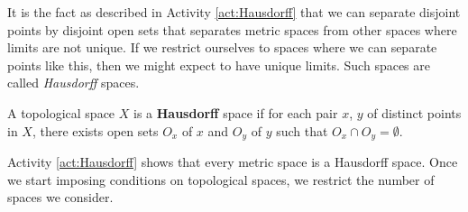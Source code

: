 \begin{comment}

\ActivitySolution

\ba
\item Consider a metric space $(x,d)$, and let $x$ and $y$ be distinct points in $X$. 
	\begin{enumerate}[i.]
	\item Suppose a sequence $(x_n)$ has $x$ as a limit. Then there exists a positive integer $N$ such that $n \geq n$ implies $x_n \in B(x,r)$. But then $x_n \notin B(y,s)$ and so $y$ cannot be a limit of the sequence $(x_n)$. 
	
	\item Let $r = \frac{d(x,y)}{2}$. To show that $B(x,r) \cap B(y,r) = \emptyset$, suppose $z \in (B(x,r) \cap B(y,r)$. Then $z \in B(x,r)$. The triangle inequality $d(x,y) \leq d(x,z) + d(z,y)$ shows that 
	\[d(z,y) \geq d(x,y) - d(x,z) > d(x,y) - r = 2r -r = r.\]
	But this contradicts $z \in B(y,r)$. We conclude that $B(x,r) \cap B(y,r) = \emptyset$.
	
	\end{enumerate}

\item The only open sets that contain $a$ are $\{a,c\}$ and $X$ and the only open sets that contain $b$ are $\{b,c\}$ and $X$. These open sets all contain $c$, so there are no disjoint open sets $O_x$ and $O_c$ containing $x$ and $c$. 	

\ea

\end{comment}

It is the fact as described in Activity \ref{act:Hausdorff} that we can separate disjoint points by disjoint open sets that separates metric spaces from other spaces where limits are not unique. If we restrict ourselves to spaces where we can separate points like this, then we might expect to have unique limits. Such spaces are called \emph{Hausdorff} spaces. 

\begin{definition} A topological space $X$ is a \textbf{Hausdorff} space if for each pair $x$, $y$ of distinct points in $X$, there exists open sets $O_x$ of $x$ and $O_y$ of $y$ such that $O_x \cap O_y = \emptyset$. 
\end{definition}

Activity \ref{act:Hausdorff} shows that every metric space is a Hausdorff space. Once we start imposing conditions on topological spaces, we restrict the number of spaces we consider.

